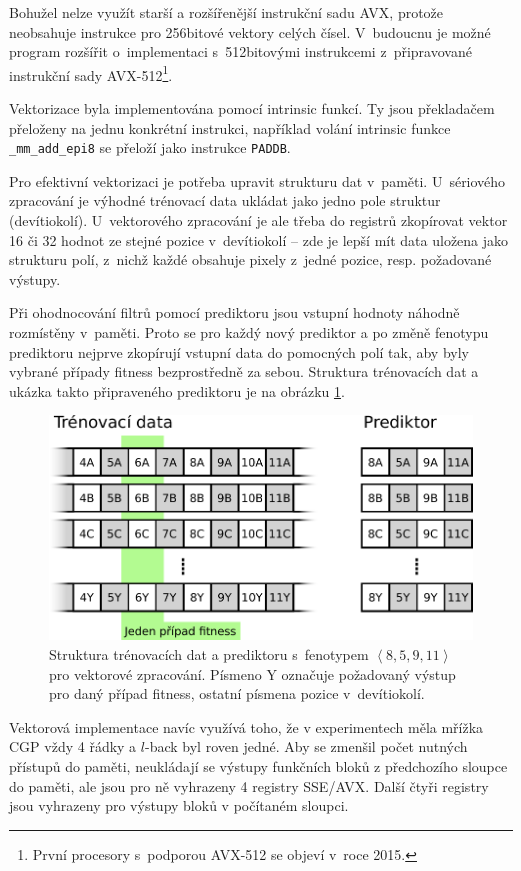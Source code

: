 \documentclass[czech]{ExcelAtFIT} %
\begin{document}
Bohužel nelze využít starší a rozšířenější instrukční sadu AVX, protože neobsahuje instrukce pro 256bitové vektory celých čísel. V~budoucnu je možné program rozšířit o~implementaci s~512bitovými instrukcemi z~připravované instrukční sady AVX-512\footnote{První procesory s~podporou AVX-512 se objeví v~roce 2015.}.

Vektorizace byla implementována pomocí intrinsic funkcí. Ty jsou překladačem přeloženy na jednu konkrétní instrukci, například volání intrinsic funkce \texttt{\_mm\_add\_epi8} se přeloží jako instrukce \texttt{PADDB}.

Pro efektivní vektorizaci je potřeba upravit strukturu dat v~paměti. U~sériového zpracování je výhodné trénovací data ukládat jako jedno pole struktur (devítiokolí). U~vektorového zpracování je ale třeba do registrů zko\-pí\-ro\-vat vektor 16 či 32 hodnot ze stejné pozice v~devítiokolí -- zde je lepší mít data uložena jako strukturu polí, z~nichž každé obsahuje pixely z~jedné pozice, resp. požadované výstupy.

Při ohodnocování filtrů pomocí prediktoru jsou vstupní hodnoty náhodně rozmístěny v~paměti. Proto se pro každý nový prediktor a po změně fenotypu prediktoru nejprve zkopírují vstupní data do pomocných polí tak, aby byly vybrané případy fitness bezprostředně za sebou. Struktura trénovacích dat a ukázka takto připraveného prediktoru je na obrázku \ref{fig:SimdDataStructure}.


\begin{figure}[htb]
    \centering
    \includegraphics[width=0.8\linewidth]{images/simd4.pdf}
    \caption{Struktura trénovacích dat a prediktoru s~fenotypem \emph{$\left<8, 5, 9, 11\right>$} pro vektorové zpracování. Písmeno Y označuje požadovaný výstup pro daný případ fitness, ostatní písmena pozice v~devítiokolí.}
    \label{fig:SimdDataStructure}
\end{figure}

Vektorová implementace navíc využívá toho, že v experimentech měla mřížka CGP vždy 4 řádky a $l$-back byl roven jedné. Aby se zmenšil počet nutných přístupů do paměti, neukládají se výstupy funkčních bloků z předchozího sloupce do paměti, ale jsou pro ně vyhrazeny 4 registry SSE/AVX. Další čtyři registry jsou vyhrazeny pro výstupy bloků v počítaném sloupci.
\end{document}
